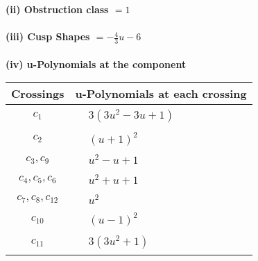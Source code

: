 \documentclass[1p]{elsarticle_modified}
\theoremstyle{definition}
\begin{document}
\flushleft \textbf{(ii) Obstruction class $= 1$}\\~\\
\flushleft \textbf{(iii) Cusp Shapes $= -\frac{4}{3} u-6$}\\~\\
\newpage\renewcommand{\arraystretch}{1}
\flushleft \textbf{(iv) u-Polynomials at the component}\newline \\
\begin{tabular}{m{50pt}|m{274pt}}
Crossings & \hspace{64pt}u-Polynomials at each crossing \\
\hline $$\begin{aligned}c_{1}\end{aligned}$$&$\begin{aligned}
&3(3 u^2-3 u+1)
\end{aligned}$\\
\hline $$\begin{aligned}c_{2}\end{aligned}$$&$\begin{aligned}
&(u+1)^2
\end{aligned}$\\
\hline $$\begin{aligned}c_{3},c_{9}\end{aligned}$$&$\begin{aligned}
&u^2- u+1
\end{aligned}$\\
\hline $$\begin{aligned}c_{4},c_{5},c_{6}\end{aligned}$$&$\begin{aligned}
&u^2+u+1
\end{aligned}$\\
\hline $$\begin{aligned}c_{7},c_{8},c_{12}\end{aligned}$$&$\begin{aligned}
&u^2
\end{aligned}$\\
\hline $$\begin{aligned}c_{10}\end{aligned}$$&$\begin{aligned}
&(u-1)^2
\end{aligned}$\\
\hline $$\begin{aligned}c_{11}\end{aligned}$$&$\begin{aligned}
&3(3 u^2+1)
\end{aligned}$\\
\hline
\end{tabular}\\~\\
\end{document}
